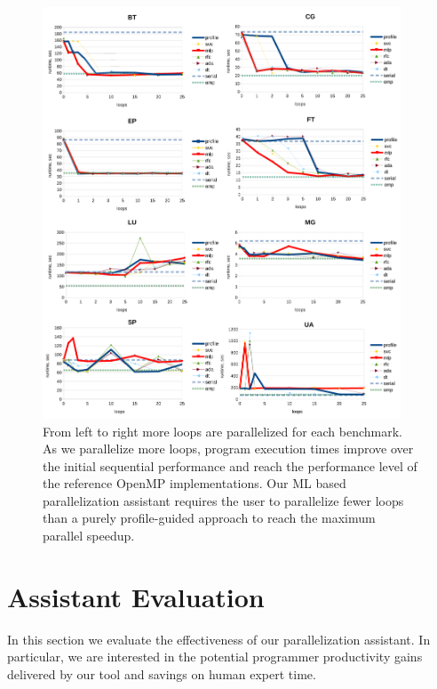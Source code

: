 \begin{figure}[t!]
\centering
\includegraphics[width=0.95\textwidth]{images/perf_conv_curves_new.pdf}
\caption{From left to right more loops are parallelized for each benchmark. As we parallelize more loops, program execution times improve over the initial sequential performance and reach the performance level of the reference OpenMP implementations. Our ML based parallelization assistant requires the user to parallelize fewer loops than a purely profile-guided approach to reach the maximum parallel speedup.}
\label{fig:performance_convergence_line}
\vspace*{5mm} %
\end{figure}

\section{Assistant Evaluation}
\label{evaluation}

In this section we evaluate the effectiveness of our parallelization assistant. In particular, we are interested in the potential programmer productivity gains delivered by our tool and savings on human expert time.

